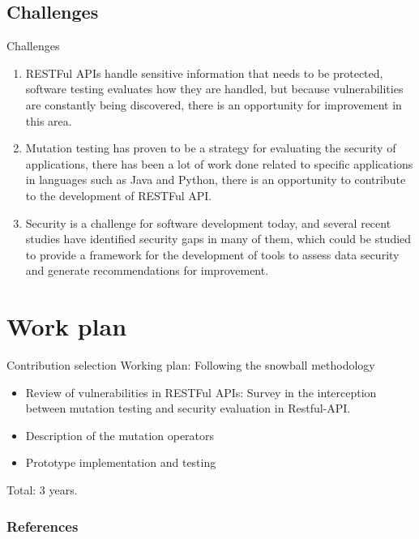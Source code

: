 \documentclass[10pt]{beamer}
\theoremstyle{remark}
\theoremstyle{definition}
\begin{document}
\subsection{Challenges}

\begin{frame}{Challenges}
\begin{enumerate}
    \item RESTFul APIs handle sensitive information that needs to be protected, software testing evaluates how they are handled, but because vulnerabilities are constantly being discovered, there is an opportunity for improvement in this area.
    \item Mutation testing has proven to be a strategy for evaluating the security of applications, there has been a lot of work done related to specific applications in languages such as Java and Python, there is an opportunity to contribute to the development of RESTFul API.
    \item Security is a challenge for software development today, and several recent studies have identified security gaps in many of them, which could be studied to provide a framework for the development of tools to assess data security and generate recommendations for improvement.
\end{enumerate}
\end{frame}


\section{Work plan}

\begin{frame}{Contribution selection}
Working plan: Following the snowball methodology
\begin{itemize}
    \item Review of vulnerabilities in RESTFul APIs: Survey in the interception between mutation testing and security evaluation in Restful-API.
    \item Description of the mutation operators
    \item Prototype implementation and testing
\end{itemize}
Total: 3 years.
\end{frame}


\begin{frame}[allowframebreaks]
\frametitle{References}
\end{frame}
\end{document}
